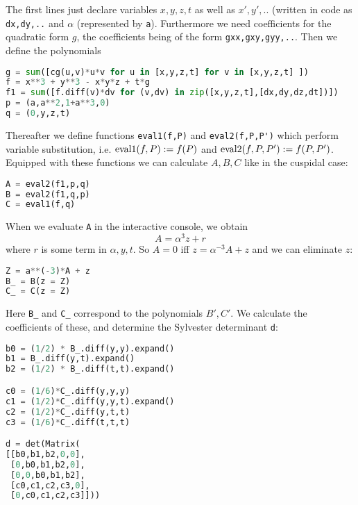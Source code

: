 The first lines just declare variables $x,y,z,t$ as well as $x',y',..$ (written in code as \verb|dx,dy,..| and $\alpha$ (represented by \verb|a|). Furthermore we need coefficients for the quadratic form $g$, the coefficients being of the form \verb|gxx,gxy,gyy,..|.
Then we define the polynomials
\begin{lstlisting}[frame=single,language=python]
g = sum([cg(u,v)*u*v for u in [x,y,z,t] for v in [x,y,z,t] ])
f = x**3 + y**3 - x*y*z + t*g
f1 = sum([f.diff(v)*dv for (v,dv) in zip([x,y,z,t],[dx,dy,dz,dt])])
p = (a,a**2,1+a**3,0)
q = (0,y,z,t)
\end{lstlisting}

Thereafter we define functions \verb|eval1(f,P)| and \verb|eval2(f,P,P')| which perform variable substitution, i.e. ${\operatorname{eval1}}(f,P) := f(P)$ and ${\operatorname{eval2}}(f,P,P') := f(P,P')$.
Equipped with these functions we can calculate $A,B,C$ like in the cuspidal case:

\begin{lstlisting}[frame=single,language=python]
A = eval2(f1,p,q)
B = eval2(f1,q,p)
C = eval1(f,q)
\end{lstlisting}

When we evaluate \verb|A| in the interactive console, we obtain
\begin{equation}
A = \alpha^3 z + r
\end{equation}
where $r$ is some term in $\alpha, y,t$.
So $A = 0$ iff $z = \alpha^{-3}A + z$ and we can eliminate $z$:

\begin{lstlisting}[frame=single,language=python]
Z = a**(-3)*A + z
B_ = B(z = Z)
C_ = C(z = Z)
\end{lstlisting}

Here \verb|B_| and \verb|C_| correspond to the polynomials $B',C'$.
We calculate the coefficients of these, and determine the Sylvester determinant \verb|d|:


\begin{lstlisting}[frame=single,language=python]
b0 = (1/2) * B_.diff(y,y).expand()
b1 = B_.diff(y,t).expand()
b2 = (1/2) * B_.diff(t,t).expand()

c0 = (1/6)*C_.diff(y,y,y)
c1 = (1/2)*C_.diff(y,y,t).expand()
c2 = (1/2)*C_.diff(y,t,t)
c3 = (1/6)*C_.diff(t,t,t)

d = det(Matrix(
[[b0,b1,b2,0,0], 
 [0,b0,b1,b2,0], 
 [0,0,b0,b1,b2], 
 [c0,c1,c2,c3,0], 
 [0,c0,c1,c2,c3]]))
\end{lstlisting}

